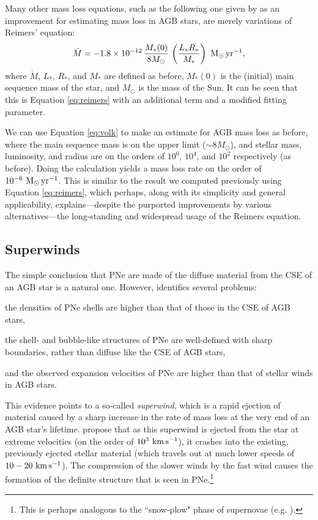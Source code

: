 \documentclass[twocolumn]{aastex63}
\begin{document}
Many other mass loss equations, such as the following one given by \cite{volk} as an improvement for estimating mass loss in AGB stars, are merely variations of Reimers' equation: 
\begin{equation}\label{eq:volk}
    \dot M = -1.8 \times 10^{-12}\, \frac{M_*(0)}{8M_\odot}\, \left(\frac{L_*R_*}{M_*}\right)~{\rm M_\odot\,yr^{-1}},
\end{equation}
where $\dot M$, $L_*$, $R_*$, and $M_*$ are defined as before, $M_*(0)$ is the (initial) main sequence mass of the star, and $M_\odot$ is the mass of the Sun. It can be seen that this is Equation \ref{eq:reimers} with an additional term and a modified fitting parameter. 

We can use Equation \ref{eq:volk} to make an estimate for AGB mass loss as before, where the main sequence mass is on the upper limit ($\sim 8 M_\odot$), and stellar mass, luminosity, and radius are on the orders of $10^0$, $10^4$, and $10^2$ respectively (as before). Doing the calculation yields a mass loss rate on the order of $10^{-6}~{\rm M_\odot\,yr^{-1}}$. This is similar to the result we computed previously using Equation \ref{eq:reimers}, which perhaps, along with its simplicity and general applicability, explains—despite the purported improvements by various alternatives—the long-standing and widespread usage of the Reimers equation. 


\hfill\vspace{-0.2cm}
\subsection{Superwinds} \label{subsec:superwinds}

The simple conclusion that PNe are made of the diffuse material from the CSE of an AGB star is a natural one. However, \cite{kwok2000} identifies several problems: 
\begin{enumerate*}[label=(\roman*)]
    \item the densities of PNe shells are higher than that of those in the CSE of AGB stars,
    \item the shell- and bubble-like structures of PNe are well-defined with sharp boundaries, rather than diffuse like the CSE of AGB stars, 
    \item and the observed expansion velocities of PNe are higher than that of stellar winds in AGB stars. 
\end{enumerate*}

This evidence points to a so-called \textit{superwind}, which is a rapid ejection of material caused by a sharp increase in the rate of mass loss at the very end of an AGB star's lifetime. \cite{kwok1978} propose that as this superwind is ejected from the star at extreme velocities (on the order of $10^{3}~{\rm km\,s^{-1}}$), it crashes into the existing, previously ejected stellar material (which travels out at much lower speeds of $10-20~{\rm km\,s^{-1}}$). The compression of the slower winds by the fast wind causes the formation of the definite structure that is seen in PNe.\footnote{This is perhaps analogous to the ``snow-plow" phase of supernovae (e.g. \cite{moriya, mccray}).}
\end{document}
